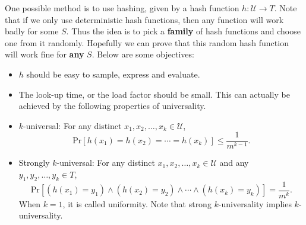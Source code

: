 \documentclass[openany]{book}
\begin{document}
One possible method is to use hashing, given by a hash function $h:\mathcal{U}\rightarrow T$. Note that if we only use deterministic hash functions, then any function will work badly for some $S$. Thus the idea is to pick a \textbf{family} of hash functions and choose one from it randomly. Hopefully we can prove that this random hash function will work fine for \textbf{any} $S$. Below are some objectives:
\begin{itemize}
    \item $h$ should be easy to sample, express and evaluate.
    \item The look-up time, or the load factor should be small. This can actually be achieved by the following properties of universality.
    \item $k$-universal: For any distinct $x_1,x_2,\ldots,x_k\in \mathcal{U}$,
    \begin{equation}
        \mathrm{Pr}\left[h(x_1)=h(x_2)=\cdots=h(x_k)\right]\le \frac{1}{m^{k-1}}.
    \end{equation}
    \item Strongly $k$-universal: For any distinct $x_1,x_2,\ldots,x_k\in \mathcal{U}$ and any $y_1,y_2,\ldots,y_k\in T$,
    \begin{equation}
        \mathrm{Pr}\left[(h(x_1)=y_1)\wedge(h(x_2)=y_2)\wedge\cdots\wedge(h(x_k)=y_k)\right]= \frac{1}{m^k}.
    \end{equation}
    When $k=1$, it is called uniformity. Note that strong $k$-universality implies $k$-universality.
\end{itemize}
\end{document}
